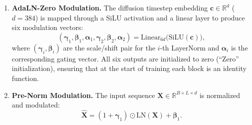\documentclass[12pt,letterpaper]{report}
\begin{document}
\begin{enumerate}
    \item \textbf{AdaLN-Zero Modulation.} The diffusion timestep embedding
        $\mathbf{c} \in \mathbb{R}^{d}$ ($d = 384$) is mapped through a SiLU
        activation and a linear layer to produce six modulation vectors:
        \begin{equation}\label{eq:adaln}
            (\boldsymbol{\gamma}_1, \boldsymbol{\beta}_1, \boldsymbol{\alpha}_1,
             \boldsymbol{\gamma}_2, \boldsymbol{\beta}_2, \boldsymbol{\alpha}_2)
            = \mathrm{Linear}_{6d}\bigl(\mathrm{SiLU}(\mathbf{c})\bigr),
        \end{equation}
        where $(\boldsymbol{\gamma}_i, \boldsymbol{\beta}_i)$ are the
        scale/shift pair for the $i$-th LayerNorm and $\boldsymbol{\alpha}_i$
        is the corresponding gating vector. All six outputs are initialized to
        zero (``Zero'' initialization), ensuring that at the start of training
        each block is an identity function. %

    \item \textbf{Pre-Norm Modulation.} The input sequence
        $\mathbf{X} \in \mathbb{R}^{B \times L \times d}$ is normalized and
        modulated:
        \begin{equation}\label{eq:prenorm}
            \hat{\mathbf{X}} = (1 + \boldsymbol{\gamma}_1) \odot \mathrm{LN}(\mathbf{X})
                              + \boldsymbol{\beta}_1.
        \end{equation}


\end{enumerate}
\end{document}
